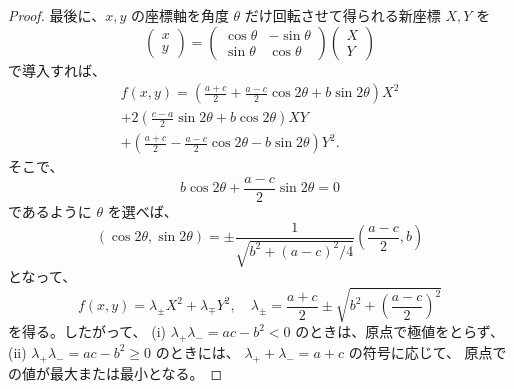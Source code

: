 \documentclass[a4paper]{jsarticle}
\theoremstyle{definition}
\theoremstyle{remark}
\begin{document}
\begin{proof}
最後に、$x,y$ の座標軸を角度 $\theta$ だけ回転させて得られる新座標 $X,Y$ を
\[
\begin{pmatrix}
x\\
y
\end{pmatrix}
=
\begin{pmatrix}
\cos\theta & -\sin\theta\\
\sin\theta & \cos\theta
\end{pmatrix}
\begin{pmatrix}
X\\
Y
\end{pmatrix}
\]
で導入すれば、
\begin{multline*}
f(x,y) = \left(\frac{a+c}{2} + \frac{a-c}{2}\cos 2\theta + b\sin 2\theta\right) X^2\\
+ 2\left(\frac{c-a}{2}\sin 2\theta + b \cos 2\theta\right) XY\\ 
+ \left(\frac{a+c}{2} - \frac{a-c}{2}\cos 2\theta - b \sin 2\theta\right) Y^2. 
\end{multline*}
そこで、
\[
b\cos 2\theta + \frac{a-c}{2} \sin 2\theta = 0
\]
であるように $\theta$ を選べば、
\[
(\cos 2\theta,\sin 2\theta) 
= \pm \frac{1}{\sqrt{b^2 + (a-c)^2/4}} \left( \frac{a-c}{2},b\right)
\]
となって、
\[
f(x,y) = \lambda_\pm X^2 + \lambda_{\mp} Y^2, 
\quad 
\lambda_\pm = \frac{a+c}{2} \pm \sqrt{b^2 + \left(\frac{a-c}{2}\right)^2}
\]
を得る。したがって、
(i) $\lambda_+ \lambda_- = ac - b^2 < 0$ のときは、原点で極値をとらず、
(ii) $\lambda_+ \lambda_- = ac - b^2 \geq 0$ のときには、
$\lambda_+ + \lambda_- = a + c$ の符号に応じて、
原点での値が最大または最小となる。



\end{proof}
\end{document}

